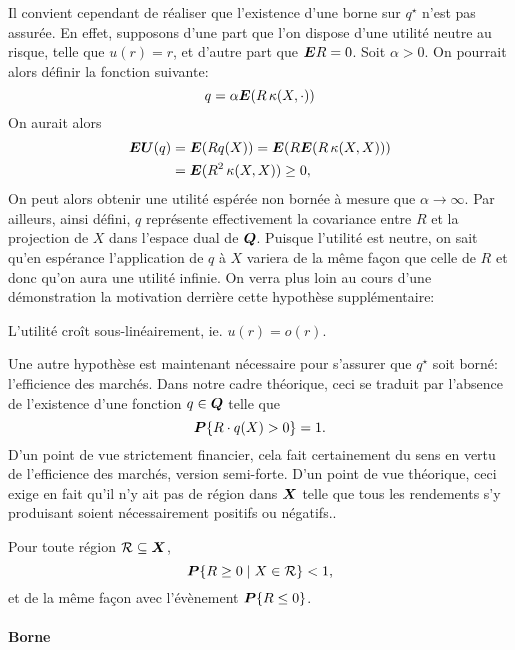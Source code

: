 Il convient cependant de réaliser que l'existence d'une borne sur $q^\star$ n'est pas
assurée. En effet, supposons d'une part que l'on dispose d'une utilité neutre au risque,
telle que $u(r) = r$, et d'autre part que $\bm E R=0$. Soit $\alpha>0$. On pourrait alors définir
la fonction suivante:
\begin{equation}
  q = \alpha\bm E(R\,\kappa(X,\cdot))
\end{equation}
On aurait alors
\begin{align}
  \bm{EU}(q) &= \bm E(R q(X)) = \bm E(R\bm E(R\,\kappa(X,X)))\\
         &= \bm E(R^2\,\kappa(X,X)) \geq 0,
\end{align}
On peut alors obtenir une utilité espérée non bornée à mesure que $\alpha\to\infty$. Par ailleurs,
ainsi défini, $q$ représente effectivement la covariance entre $R$ et la projection de $X$
dans l'espace dual de $\bm Q$. Puisque l'utilité est neutre, on sait qu'en espérance
l'application de $q$ à $X$ variera de la même façon que celle de $R$ et donc qu'on aura
une utilité infinie. On verra plus loin au cours d'une démonstration la motivation
derrière cette hypothèse supplémentaire:
\begin{assumption}
  L'utilité croît sous-linéairement, ie. $u(r) = o(r)$. 
\end{assumption}

Une autre hypothèse est maintenant nécessaire pour s'assurer que $q^\star$ soit borné:
l'efficience des marchés. Dans notre cadre théorique, ceci se traduit par l'absence de
l'existence d'une fonction $q \in \bm Q$ telle que
\begin{equation}
  \bm P\{R\cdot q(X) > 0\} = 1.
\end{equation}
D'un point de vue strictement financier, cela fait certainement du sens en vertu de
l'efficience des marchés, version semi-forte\cit. D'un point de vue théorique, ceci exige
en fait qu'il n'y ait pas de région dans $\bm{X}$ telle que tous les rendements s'y produisant
soient nécessairement positifs ou négatifs..

\begin{assumption}
  \label{hyp:arb}
  Pour toute région $\mathcal{R}\subseteq\bm{X}$,
  \begin{equation}
    \bm P\{R \geq 0 \mid X \in \mathcal{R}\} < 1,
  \end{equation}
  et de la même façon avec l'évènement $\bm P\{R \leq 0\}$. 
\end{assumption}

\paragraph{Borne}

